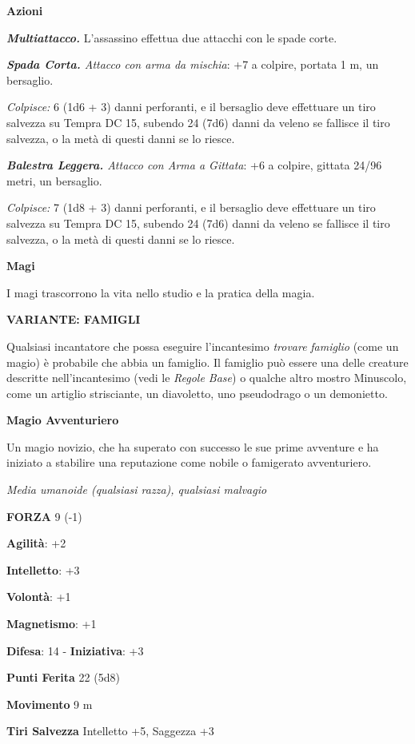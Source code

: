 \begin{multicols}{2}
\smallskip\textbf{Azioni}

\emph{\textbf{Multiattacco.}} L'assassino effettua due attacchi con le
spade corte.

\emph{\textbf{Spada Corta.} Attacco con arma da mischia}: +7 a colpire,
portata 1 m, un bersaglio.

\emph{Colpisce:} 6 (1d6 + 3) danni perforanti, e il bersaglio deve
effettuare un tiro salvezza su Tempra DC 15, subendo 24 (7d6)
danni da veleno se fallisce il tiro salvezza, o la metà di questi danni
se lo riesce.

\emph{\textbf{Balestra Leggera.} Attacco con Arma a Gittata}: +6 a
colpire, gittata 24/96 metri, un bersaglio.

\emph{Colpisce:} 7 (1d8 + 3) danni perforanti, e il bersaglio deve
effettuare un tiro salvezza su Tempra DC 15, subendo 24 (7d6)
danni da veleno se fallisce il tiro salvezza, o la metà di questi danni
se lo riesce.

\textbf{Magi}

I magi trascorrono la vita nello studio e la pratica della magia.

\textbf{VARIANTE: FAMIGLI}

Qualsiasi incantatore che possa eseguire l'incantesimo \emph{trovare}
\emph{famiglio} (come un magio) è probabile che abbia un famiglio. Il
famiglio può essere una delle creature descritte nell'incantesimo (vedi
le \emph{Regole Base}) o qualche altro mostro Minuscolo, come un
artiglio strisciante, un diavoletto, uno pseudodrago o un demonietto.

\textbf{Magio Avventuriero}

Un magio novizio, che ha superato con successo le sue prime avventure e
ha iniziato a stabilire una reputazione come nobile o famigerato
avventuriero.

\emph{Media umanoide (qualsiasi razza), qualsiasi malvagio}

\textbf{FORZA} 9 (-1)

\textbf{Agilità}: +2

\textbf{Intelletto}: +3

\textbf{Volontà}: +1

\textbf{Magnetismo}: +1

\textbf{Difesa}: 14 - \textbf{Iniziativa}: +3

\textbf{Punti Ferita} 22 (5d8)

\textbf{Movimento} 9 m

\textbf{Tiri Salvezza} Intelletto +5, Saggezza +3


\end{multicols}
